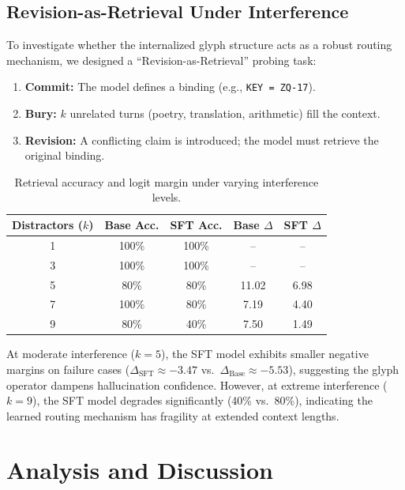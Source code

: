 \documentclass[11pt]{article}
\begin{document}
\subsection{Revision-as-Retrieval Under Interference}

To investigate whether the internalized glyph structure acts as a robust routing mechanism, we designed a ``Revision-as-Retrieval'' probing task:

\begin{enumerate}
    \item \textbf{Commit:} The model defines a binding (e.g., \texttt{KEY = ZQ-17}).
    \item \textbf{Bury:} $k$ unrelated turns (poetry, translation, arithmetic) fill the context.
    \item \textbf{Revision:} A conflicting claim is introduced; the model must retrieve the original binding.
\end{enumerate}

\begin{table}[h]
\centering
\caption{Retrieval accuracy and logit margin under varying interference levels.}
\label{tab:retrieval}
\begin{tabular}{@{}ccccc@{}}
\toprule
\textbf{Distractors ($k$)} & \textbf{Base Acc.} & \textbf{SFT Acc.} & \textbf{Base $\Delta$} & \textbf{SFT $\Delta$} \\
\midrule
1 & 100\% & 100\% & -- & -- \\
3 & 100\% & 100\% & -- & -- \\
5 & 80\% & 80\% & 11.02 & 6.98 \\
7 & 100\% & 80\% & 7.19 & 4.40 \\
9 & 80\% & 40\% & 7.50 & 1.49 \\
\bottomrule
\end{tabular}
\end{table}

At moderate interference ($k{=}5$), the SFT model exhibits smaller negative margins on failure cases ($\Delta_\text{SFT} \approx -3.47$ vs.\ $\Delta_\text{Base} \approx -5.53$), suggesting the glyph operator dampens hallucination confidence. However, at extreme interference ($k{=}9$), the SFT model degrades significantly (40\% vs.\ 80\%), indicating the learned routing mechanism has fragility at extended context lengths.

\section{Analysis and Discussion}
\end{document}
